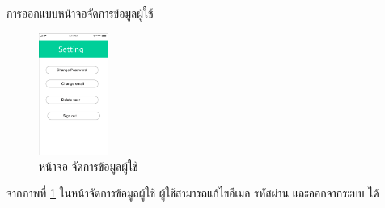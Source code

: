 		\item การออกแบบหน้าจอจัดการข้อมูลผู้ใช้
							\begin{figure}[H]
											\centering
											\includegraphics[width=0.2\textwidth]{Figures/3/UIDESIGN/3.png}
											\caption{หน้าจอ จัดการข้อมูลผู้ใช้ }
											\label{Fig:3.png}
										\end{figure}
										จากภาพที่ \ref{Fig:3.png} ในหน้าจัดการข้อมูลผู้ใช้ ผู้ใช้สามารถแก้ไขอีเมล รหัสผ่าน  และออกจากระบบ ได้ 

